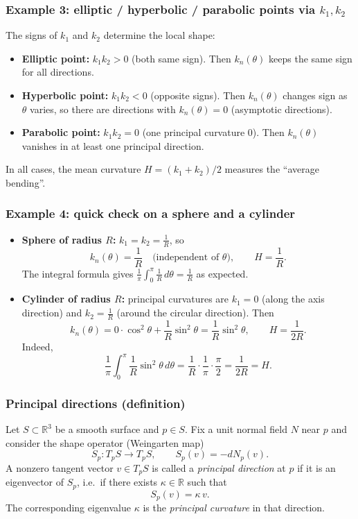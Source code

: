 \documentclass[12pt,a4paper]{article}
\theoremstyle{plain}
\theoremstyle{definition}      %
\begin{document}
\subsubsection*{Example 3: elliptic / hyperbolic / parabolic points via $k_1,k_2$}
The signs of $k_1$ and $k_2$ determine the local shape:
\begin{itemize}
	\item \textbf{Elliptic point:} $k_1k_2>0$ (both same sign). Then $k_n(\theta)$ keeps the same sign for all directions.
	\item \textbf{Hyperbolic point:} $k_1k_2<0$ (opposite signs). Then $k_n(\theta)$ changes sign as $\theta$ varies, so there are directions with $k_n(\theta)=0$ (asymptotic directions).
	\item \textbf{Parabolic point:} $k_1k_2=0$ (one principal curvature $0$). Then $k_n(\theta)$ vanishes in at least one principal direction.
\end{itemize}
In all cases, the mean curvature $H=(k_1+k_2)/2$ measures the ``average bending''.

\subsubsection*{Example 4: quick check on a sphere and a cylinder}
\begin{itemize}
	\item \textbf{Sphere of radius $R$:} $k_1=k_2=\frac{1}{R}$, so
	\[
	k_n(\theta)=\frac{1}{R}\quad\text{(independent of $\theta$)},\qquad
	H=\frac{1}{R}.
	\]
	The integral formula gives $\frac{1}{\pi}\int_0^\pi \frac{1}{R}\,d\theta=\frac{1}{R}$ as expected.
	
	\item \textbf{Cylinder of radius $R$:} principal curvatures are $k_1=0$ (along the axis direction) and $k_2=\frac{1}{R}$ (around the circular direction). Then
	\[
	k_n(\theta)=0\cdot\cos^2\theta+\frac{1}{R}\sin^2\theta=\frac{1}{R}\sin^2\theta,
	\qquad
	H=\frac{1}{2R}.
	\]
	Indeed,
	\[
	\frac{1}{\pi}\int_0^\pi \frac{1}{R}\sin^2\theta\,d\theta
	=\frac{1}{R}\cdot\frac{1}{\pi}\cdot\frac{\pi}{2}
	=\frac{1}{2R}=H.
	\]
\end{itemize}


\subsubsection*{Principal directions (definition)}
Let $S\subset\mathbb R^3$ be a smooth surface and $p\in S$. Fix a unit normal field $N$ near $p$
and consider the shape operator (Weingarten map)
\[
S_p:T_pS\to T_pS,\qquad S_p(v)=-dN_p(v).
\]
A nonzero tangent vector $v\in T_pS$ is called a \emph{principal direction} at $p$ if it is an
eigenvector of $S_p$, i.e.\ if there exists $\kappa\in\mathbb R$ such that
\[
S_p(v)=\kappa\,v.
\]
The corresponding eigenvalue $\kappa$ is the \emph{principal curvature} in that direction.
\end{document}
